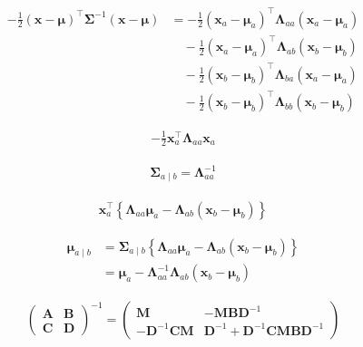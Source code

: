 \documentclass{article}
\begin{document}
\begin{align*}
-\frac{1}{2}(\mathbf{x}-\boldsymbol{\mu})^{\top} \boldsymbol{\Sigma}^{-1}(\mathbf{x}-\boldsymbol{\mu}) 
& = -\frac{1}{2}\left(\mathbf{x}_{a}-\boldsymbol{\mu}_{a}\right)^{\top} \boldsymbol{\Lambda}_{a a}\left(\mathbf{x}_{a}-\boldsymbol{\mu}_{a}\right) \\
& \quad - \frac{1}{2}\left(\mathbf{x}_{a}-\boldsymbol{\mu}_{a}\right)^{\top} \boldsymbol{\Lambda}_{a b}\left(\mathbf{x}_{b}-\boldsymbol{\mu}_{b}\right) \\
& \quad - \frac{1}{2}\left(\mathbf{x}_{b}-\boldsymbol{\mu}_{b}\right)^{\top} \boldsymbol{\Lambda}_{b a}\left(\mathbf{x}_{a}-\boldsymbol{\mu}_{a}\right) \\
& \quad - \frac{1}{2}\left(\mathbf{x}_{b}-\boldsymbol{\mu}_{b}\right)^{\top} \boldsymbol{\Lambda}_{b b}\left(\mathbf{x}_{b}-\boldsymbol{\mu}_{b}\right)
\tag{3.54}
\end{align*}

\begin{align*}
-\frac{1}{2} \mathbf{x}_{a}^{\top} \boldsymbol{\Lambda}_{a a} \mathbf{x}_{a}
\tag{3.56}
\end{align*}

\begin{align*}
\boldsymbol{\Sigma}_{a \mid b} = \boldsymbol{\Lambda}_{a a}^{-1}
\tag{3.57}
\end{align*}

\begin{align*}
\mathbf{x}_{a}^{\top}\left\{\boldsymbol{\Lambda}_{a a} \boldsymbol{\mu}_{a} - \boldsymbol{\Lambda}_{a b} \left(\mathbf{x}_{b}-\boldsymbol{\mu}_{b}\right)\right\}
\tag{3.58}
\end{align*}

\begin{align*}
\boldsymbol{\mu}_{a \mid b} 
& = \boldsymbol{\Sigma}_{a \mid b} \left\{\boldsymbol{\Lambda}_{a a} \boldsymbol{\mu}_{a} - \boldsymbol{\Lambda}_{a b} \left(\mathbf{x}_{b}-\boldsymbol{\mu}_{b}\right)\right\} \\
& = \boldsymbol{\mu}_{a} - \boldsymbol{\Lambda}_{a a}^{-1} \boldsymbol{\Lambda}_{a b}\left(\mathbf{x}_{b} - \boldsymbol{\mu}_{b}\right)
\tag{3.59}
\end{align*}

\begin{align*}
\left(\begin{array}{ll}
\mathbf{A} & \mathbf{B} \\
\mathbf{C} & \mathbf{D}
\end{array}\right)^{-1} = \left(\begin{array}{cc}
\mathbf{M} & -\mathbf{M B D}^{-1} \\
-\mathbf{D}^{-1} \mathbf{C M} & \mathbf{D}^{-1} + \mathbf{D}^{-1} \mathbf{C M B D}^{-1}
\end{array}\right)
\tag{3.60}
\end{align*}
\end{document}
